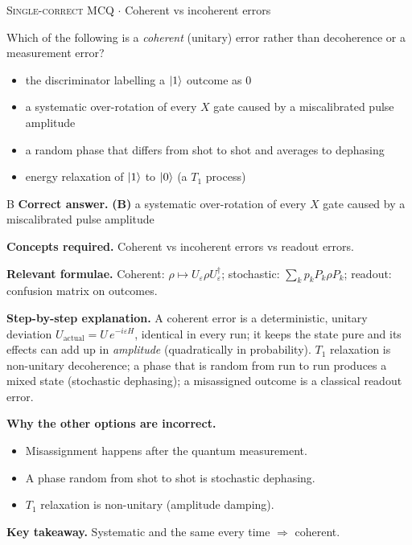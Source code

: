 \documentclass[11pt,a4paper]{article}
\newcommand{\optlabel}[1]{\textbf{(#1)}}
\newcommand{\correctlabel}[1]{\textcolor{okgreen}{\textbf{(#1)}\,\ding{51}}}
\newenvironment{qitem}[1]{\begin{list}{}{\setlength{\leftmargin}{3.3em}\setlength{\labelwidth}{3.1em}%
  \setlength{\labelsep}{0.2em}\setlength{\topsep}{3pt}\setlength{\parsep}{3pt}}\item[\textbf{Q.#1}\hfill]}{\end{list}}
\newcommand{\qsep}{\par\vspace{2pt}{\color{black!15}\hrule}\vspace{4pt}}
\newcommand{\qmeta}[2]{{\footnotesize\color{black!60}\textsc{#1} \;$\cdot$\; #2}\par}
\begin{document}
\begin{qitem}{32}
\qmeta{Single-correct MCQ}{Coherent vs incoherent errors}
Which of the following is a \emph{coherent} (unitary) error rather than decoherence or a measurement error?
\begin{itemize}[leftmargin=2.6em, labelsep=0.4em, itemsep=2pt, topsep=3pt]
\item[\optlabel{A}] the discriminator labelling a $\ket1$ outcome as $0$
\item[\correctlabel{B}] a systematic over-rotation of every $X$ gate caused by a miscalibrated pulse amplitude
\item[\optlabel{C}] a random phase that differs from shot to shot and averages to dephasing
\item[\optlabel{D}] energy relaxation of $\ket1$ to $\ket0$ (a $T_1$ process)
\end{itemize}
\end{qitem}
\begin{solbox}{B}
\textbf{\color{brand}Correct answer.} \textcolor{okgreen}{\textbf{(B)}} a systematic over-rotation of every $X$ gate caused by a miscalibrated pulse amplitude

\textbf{\color{brand}Concepts required.} Coherent vs incoherent errors vs readout errors.

\textbf{\color{brand}Relevant formulae.} Coherent: $\rho \mapsto U_\varepsilon\rho U_\varepsilon^\dagger$; stochastic: $\sum_kp_kP_k\rho P_k$; readout: confusion matrix on outcomes.

\textbf{\color{brand}Step-by-step explanation.} A coherent error is a deterministic, unitary deviation $U_{\text{actual}} = U\,e^{-i\varepsilon H}$, identical in every run; it keeps the state pure
and its effects can add up in \emph{amplitude} (quadratically in probability). $T_1$ relaxation is non-unitary decoherence; a phase that is random from run
to run produces a mixed state (stochastic dephasing); a misassigned outcome is a classical readout error.

\textbf{\color{brand}Why the other options are incorrect.}
\begin{itemize}[leftmargin=2.4em, itemsep=1pt, topsep=2pt]
\item[\textbf{(A)}] Misassignment happens after the quantum measurement.
\item[\textbf{(C)}] A phase random from shot to shot is stochastic dephasing.
\item[\textbf{(D)}] $T_1$ relaxation is non-unitary (amplitude damping).
\end{itemize}
\textbf{\color{brand}Key takeaway.} Systematic and the same every time $\Rightarrow$ coherent.
\end{solbox}
\qsep
\end{document}
